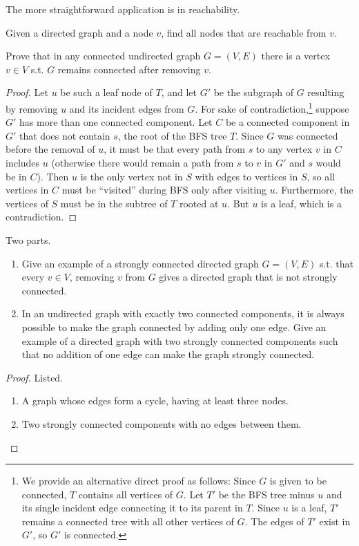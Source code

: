   The more straightforward application is in reachability. 

  \begin{example}[Reachability]
    Given a directed graph and a node $v$, find all nodes that are reachable from $v$. 
  \end{example}

  \begin{exercise}
    Prove that in any connected undirected graph $G = (V, E)$ there is a vertex $v \in V$ s.t. $G$ remains connected after removing $v$. 
  \end{exercise}
  \begin{proof}
    Let $u$ be such a leaf node of $T$, and let $G'$ be the subgraph of $G$ resulting by removing $u$ and its incident edges from $G$.
    For sake of contradiction,\footnote{We provide an alternative direct proof as follows: Since $G$ is given to be connected, $T$ contains all vertices of $G$. Let $T'$ be the BFS tree minus $u$ and its single incident edge connecting it to its parent in $T$. Since $u$ is a leaf, $T'$ remains a connected tree with all other vertices of $G$. The edges of $T'$ exist in $G'$, so $G'$ is connected.} suppose $G'$ has more than one connected component.
    Let $C$ be a connected component in $G'$ that does not contain $s$, the root of the BFS tree $T$.
    Since $G$ was connected before the removal of $u$, it must be that every path from $s$ to any vertex $v$ in $C$ includes $u$ (otherwise there would remain a path from $s$ to $v$ in $G'$ and $s$ would be in $C$).
    Then $u$ is the only vertex not in $S$ with edges to vertices in $S$, so all vertices in $C$ must be ``visited'' during BFS only after visiting $u$. Furthermore, the vertices of $S$ must be in the subtree of $T$ rooted at $u$. But $u$ is a leaf, which is a contradiction.
  \end{proof}

  \begin{exercise}
    Two parts. 
    \begin{enumerate}
      \item Give an example of a strongly connected directed graph $G = (V, E)$ s.t. that every $v \in V$, removing $v$ from $G$ gives a directed graph that is not strongly connected. 
      \item In an undirected graph with exactly two connected components, it is always possible to make the graph connected by adding only one edge. Give an example of a directed graph with two strongly connected components such that no addition of one edge can make the graph strongly connected.
    \end{enumerate}
  \end{exercise}
  \begin{proof}
    Listed. 
    \begin{enumerate}
      \item A graph whose edges form a cycle, having at least three nodes.
      \item Two strongly connected components with no edges between them.
    \end{enumerate}
  \end{proof} 

